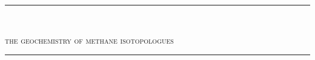 \documentclass[11pt,letterpaper,twoside]{memoir}
\begin{document}
	
	
\thispagestyle{empty}

\vspace*{0.2in}


{\color{black}\rule{0.865\textwidth}{0.4pt}}\\

{{%
	{{\noindent\huge \scshape    \color{black} the geochemistry of methane isotopologues}}\\[-0.9em]
	
	{\color{black}\rule{0.865\textwidth}{0.4pt}}\\
	\vspace{.7in}
}}
\end{document}

